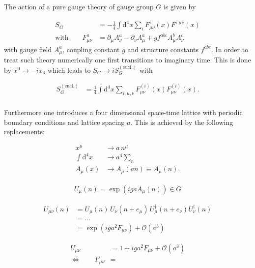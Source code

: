 The action of a pure gauge theory of gauge group $G$ is given by

\begin{align*}
 S_G                                   & = -\frac{1}{4} \int \mathrm{d}^4 x  \sum_i F_{\mu \nu}^{i} (x) F^{i \, \, \mu \nu} (x) \\
 \textrm{with} \qquad  F_{\mu \nu}^{a} & =  \partial_\mu A^{a}_\nu - \partial_\nu A^{a}_\mu  + g f^{abc} A^{b}_\mu A^{c}_\nu
\end{align*}
with gauge field $A_\mu^a$, coupling constant $g$ and structure constants $f^{abc}$\cite{Peskin:1995}. In order to treat such theory numerically one first transitions to imaginary time. This is done by $x^0 \rightarrow -i x_4$ which leads to $S_G \rightarrow i S_G^{(\textrm{eucl.})}$ with

\begin{align*}
 S_G^{(\textrm{eucl.})} & = \frac{1}{4} \int \mathrm{d}^4 x  \sum_{i,\mu,\nu} F_{\mu \nu}^{(i)} (x) F_{\mu \nu}^{(i)} (x)  \textrm{.} \\
\end{align*}

Furthermore one introduces a four dimensional space-time lattice with periodic boundary conditions and lattice spacing $a$. This is achieved by the following replacements:

\begin{align*}
 x^\mu               & \rightarrow a \, n^\mu                \\
 \int \mathrm{d}^4 x & \rightarrow a^4 \sum_n                \\
 A_\mu (x)           & \rightarrow A_\mu(an) \equiv A_\mu(n) \textrm{.}
\end{align*}

\begin{align*}
 U_\mu(n) = \exp \left( i g a A_\mu(n) \right) \in G
\end{align*}

\begin{align*}
 U_{\mu \nu}(n) & = U_\mu(n) \, U_\nu(n+e_\mu) \, U^\dagger_\mu (n + e_\nu) U^\dagger_\nu(n) \\
                & = ...                                                                      \\
                & = \exp \left( iga^2 F_{\mu \nu} \right) + \mathcal{O}(a^3)
\end{align*}




\begin{align*}
 U_{\mu \nu} &= 1 + i g a^2 F_{\mu \nu} + \mathcal{O}(a^3) \\
 \Leftrightarrow \qquad F_{\mu \nu} &=
\end{align*}

